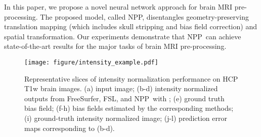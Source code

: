 \documentclass[runningheads]{llncs}
\newcommand{\modelname}{NPP}
\begin{document}
In this paper, we propose a novel neural network approach for brain MRI pre-processing. The proposed model, called \modelname, disentangles geometry-preserving translation mapping (which includes skull stripping and bias field correction) and spatial transformation. 
Our experiments demonstrate that \modelname~can achieve state-of-the-art results for the major tasks of brain MRI pre-processing.

\begin{figure}[t!]
\centering
\texttt{[image: figure/intensity\_example.pdf]}
\caption{Representative slices of intensity normalization performance on HCP T1w brain images. (a) input image; (b-d) intensity normalized outputs from FreeSurfer, FSL, and \modelname~with ; (e) ground truth bias field; (f-h) bias fields estimated by the corresponding methods; (i) ground-truth intensity normalized image; (j-l) prediction error maps corresponding to (b-d).} 
\label{fig_ie}
\end{figure}


\end{document}
